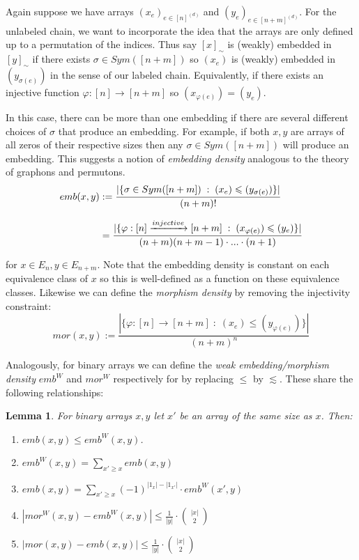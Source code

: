 \documentclass[11pt,oneside,reqno]{article}
\theoremstyle{plain}
\newtheorem{lemma}[theorem]{Lemma}
\theoremstyle{definition}
\numberwithin{equation}{section}
\renewcommand{\leq}{\leqslant}
\renewcommand{\geq}{\geqslant}
\renewcommand{\phi}{\varphi}
\begin{document}
\noindent Again suppose we have arrays $(x_e)_{e \in [n]^{(d)}}$ and $(y_e)_{e \in [n+m]^{(d)}}$. For the unlabeled chain, we want to incorporate the idea that the arrays are only defined up to a permutation of the indices. Thus say $[x]_\sim$ is (weakly) embedded in $[y]_\sim$ if there exists $\sigma \in Sym([n+m])$ so $(x_e)$ is (weakly) embedded in $(y_{\sigma(e)})$ in the sense of our labeled chain. Equivalently, if there exists an injective function $\phi:[n] \to [n+m]$ so $(x_{\phi(e)}) = (y_{e})$. 

In this case, there can be more than one embedding if there are several different choices of $\sigma$ that produce an embedding. For example, if both $x,y$ are arrays of all zeros of their respective sizes then any $\sigma \in Sym([n+m])$ will produce an embedding. This suggests a notion of \textit{embedding density} analogous to the theory of graphons and permutons.
%
\begin{align}
    emb(x,y) & := \frac{| \{\sigma \in Sym([n+m]) \; : \; (x_e) \leq (y_{\sigma(e)}) \}|}{(n+m)!} \notag\\[7pt]
            & = \frac{| \{\phi:[n] \xrightarrow{injective} [n+m] \; : \; (x_{\phi(e)}) \leq (y_e) \}|}{(n+m) (n+m-1) \cdot ... \cdot (n+1)} 
    \label{def:embedding_density}
\end{align}

\noindent for $x \in E_n, y \in E_{n+m}$. Note that the embedding density is constant on each equivalence class of $x$ so this is well-defined as a function on these equivalence classes.  Likewise we can define the \textit{morphism density} by removing the injectivity constraint:
%
\begin{equation}
    mor(x,y) := \frac{| \{\phi:[n] \to [n+m] \; : \; (x_{e}) \leq (y_{\phi(e)}) \}|}{(n+m)^n} 
\end{equation}

\noindent Analogously, for binary arrays we can define the \textit{weak embedding/morphism density} $emb^W$ and $mor^W$ respectively for by replacing $\leq$ by $\lesssim$. These share the following relationships:

\begin{lemma}
    For binary arrays $x,y$ let $x'$ be an array of the same size as $x$. Then:

    \begin{enumerate}[label=(\roman*)]
        \item $emb(x,y) \leq emb^W(x,y)$. 
        \item $emb^W(x,y) = \sum_{x' \geq x} emb(x,y)$
        \item $emb(x,y) = \sum_{x' \geq x} (-1)^{|1_x| - |1_{x'}|} \cdot emb^W(x',y)$

        \item $|mor^W(x,y) - emb^W(x,y)| \leq \frac{1}{|y|} \cdot {\;|x|\; \choose 2}$ 
        
        \item  $|mor(x,y) - emb(x,y)| \leq \frac{1}{|y|} \cdot {\;|x|\; \choose 2}$
    \end{enumerate}   

    \label{lem:relating_different_notions_of_embedding}
\end{lemma}
\end{document}
